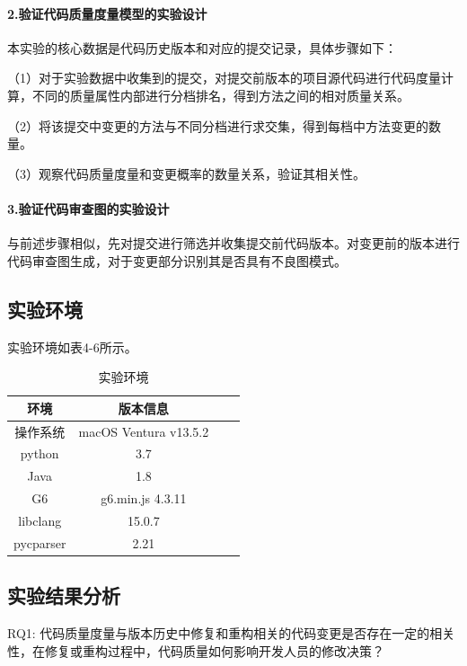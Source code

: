 \paragraph{2.验证代码质量度量模型的实验设计}  本实验的核心数据是代码历史版本和对应的提交记录，具体步骤如下：

\noindent （1）对于实验数据中收集到的提交，对提交前版本的项目源代码进行代码度量计算，不同的质量属性内部进行分档排名，得到方法之间的相对质量关系。

\noindent （2）将该提交中变更的方法与不同分档进行求交集，得到每档中方法变更的数量。

\noindent （3）观察代码质量度量和变更概率的数量关系，验证其相关性。

\paragraph{3.验证代码审查图的实验设计} 

与前述步骤相似，先对提交进行筛选并收集提交前代码版本。对变更前的版本进行代码审查图生成，对于变更部分识别其是否具有不良图模式。

\subsection{实验环境}


实验环境如表4-6所示。

\begin{table}[htbp]
\caption{实验环境}
\vspace{0.5em}\centering\wuhao
\begin{tabular}{cccc}
\toprule
    环境 & 版本信息 \\
\midrule
操作系统 & macOS Ventura v13.5.2  \\
python & 3.7   \\
Java & 1.8   \\
G6 & g6.min.js 4.3.11  \\  
libclang & 15.0.7  \\ 
pycparser & 2.21  \\
\bottomrule
\end{tabular}
\end{table}



\subsection{实验结果分析}

RQ1: 代码质量度量与版本历史中修复和重构相关的代码变更是否存在一定的相关性，在修复或重构过程中，代码质量如何影响开发人员的修改决策？

